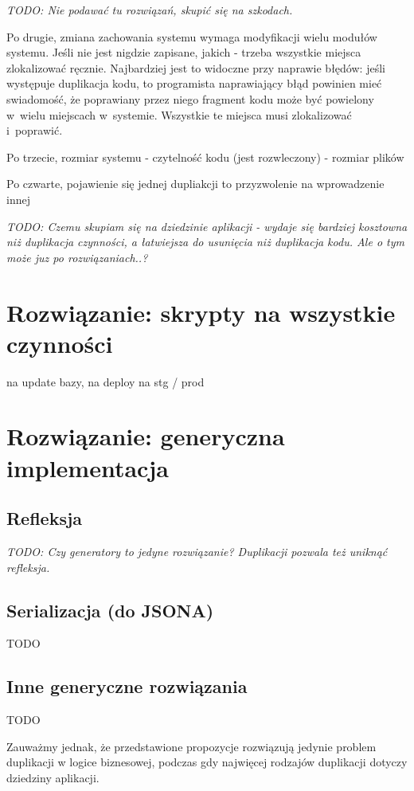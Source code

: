 \emph{TODO: Nie podawać tu rozwiązań, skupić się na szkodach.}

Po drugie, zmiana zachowania systemu wymaga modyfikacji wielu modułów systemu.
Jeśli nie jest nigdzie zapisane, jakich - trzeba wszystkie miejsca zlokalizować ręcznie.
Najbardziej jest to widoczne przy naprawie błędów: jeśli występuje duplikacja kodu, to programista naprawiający błąd powinien mieć swiadomość, że poprawiany przez niego fragment kodu może być powielony w~wielu miejscach w~systemie.
Wszystkie te miejsca musi zlokalizować i~poprawić.

Po trzecie, rozmiar systemu
- czytelność kodu (jest rozwleczony)
- rozmiar plików

Po czwarte, pojawienie się jednej dupliakcji to przyzwolenie na wprowadzenie innej


\emph{TODO: Czemu skupiam się na dziedzinie aplikacji - wydaje się bardziej kosztowna niż duplikacja czynności, a łatwiejsza do usunięcia niż duplikacja kodu. Ale o tym może juz po rozwiązaniach..?}



\section{Rozwiązanie: skrypty na wszystkie czynności}

na update bazy, na deploy na stg / prod


\section{Rozwiązanie: generyczna implementacja}

\subsection{Refleksja}
\emph{TODO: Czy generatory to jedyne rozwiązanie? Duplikacji pozwala też uniknąć refleksja.}


\subsection{Serializacja (do JSONA)}
TODO


\subsection{Inne generyczne rozwiązania}
TODO

Zauważmy jednak, że przedstawione propozycje rozwiązują jedynie problem duplikacji w logice biznesowej, podczas gdy najwięcej rodzajów duplikacji dotyczy dziedziny aplikacji.



